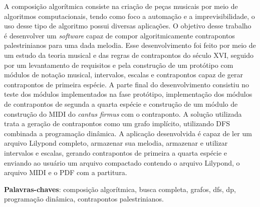 \begin{resumo}
 A composição algorítmica consiste na criação de peças musicais por meio de algoritmos computacionais, tendo como foco a automação e a imprevisibilidade, o uso desse tipo de algoritmo possui diversas aplicações. O objetivo desse trabalho é desenvolver um \textit{software} capaz de compor algoritmicamente contrapontos palestrinianos para uma dada melodia. Esse desenvolvimento foi feito por meio de um estudo da teoria musical e das regras de contrapontos do século XVI, seguido por um levantamento de requisitos e pela construção de um protótipo com módulos de notação musical, intervalos, escalas e contrapontos capaz de gerar contrapontos de primeira espécie. A parte final do desenvolvimento consistiu no teste dos módulos implementados na fase protótipo, implementação dos módulos de contrapontos de segunda a quarta espécie e construção de um módulo de construção do MIDI do \textit{cantus firmus} com o contraponto. A solução utilizada trata a geração de contrapontos como um grafo implícito, utilizando DFS combinada a programação dinâmica. A aplicação desenvolvida é capaz de ler um arquivo Lilypond completo, armazenar sua melodia, armazenar e utilizar intervalos e escalas, gerando contrapontos de primeira a quarta espécie e enviando ao usuário um arquivo compactado contendo o arquivo Lilypond, o arquivo MIDI e o PDF com a partitura.

 \vspace{\onelineskip}

 \noindent
 \textbf{Palavras-chaves}: composição algorítmica, busca completa, grafos, dfs, dp, programação dinâmica, contrapontos palestrinianos.
\end{resumo}
